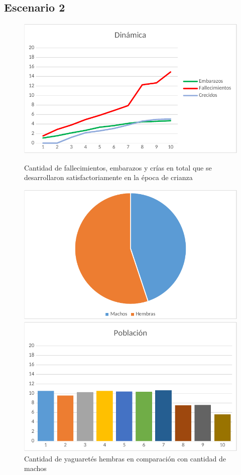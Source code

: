    \subsection{Escenario 2}

    \begin{figure}[!htb]
        \includegraphics[width=\linewidth]{images/esc2/dinamica}
        \caption{Cantidad de fallecimientos, embarazos y crías en total que se desarrollaron satisfactoriamente en la época de crianza}\label{fig:fig2-1}
        \endminipage\hfill
        \includegraphics[width=\linewidth]{images/esc2/genero}
        \caption{Cantidad de yaguaretés hembras en comparación con cantidad de machos}\label{fig:fig2-2}
        \endminipage\hfill
        \includegraphics[width=\linewidth]{images/esc2/densidad}

\end{figure}
